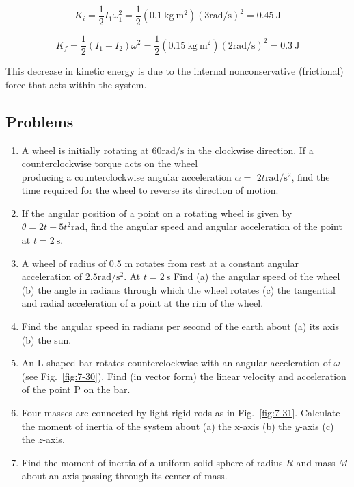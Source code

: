 \documentclass[10pt]{article}
\numberwithin{equation}{section}
\begin{document}
$$
K_{i}=\frac{1}{2} I_{1} \omega_{1}^{2}=\frac{1}{2}\left(0.1 \mathrm{~kg} \mathrm{~m}^{2}\right)(3 \mathrm{rad} / \mathrm{s})^{2}=0.45 \mathrm{~J}
$$

$$
K_{f}=\frac{1}{2}\left(I_{1}+I_{2}\right) \omega^{2}=\frac{1}{2}\left(0.15 \mathrm{~kg} \mathrm{~m}^{2}\right)(2 \mathrm{rad} / \mathrm{s})^{2}=0.3 \mathrm{~J}
$$

This decrease in kinetic energy is due to the internal nonconservative (frictional) force that acts within the system.

\subsection*{Problems}
\begin{enumerate}
  \item A wheel is initially rotating at $60 \mathrm{rad} / \mathrm{s}$ in the clockwise direction. If a counterclockwise torque acts on the wheel\\
producing a counterclockwise angular acceleration $\alpha=$ $2 t \mathrm{rad} / \mathrm{s}^{2}$, find the time required for the wheel to reverse its direction of motion.
  \item If the angular position of a point on a rotating wheel is given by $\theta=2 t+5 t^{2} \mathrm{rad}$, find the angular speed and angular acceleration of the point at $t=2 \mathrm{~s}$.
  \item A wheel of radius of 0.5 m rotates from rest at a constant angular acceleration of $2.5 \mathrm{rad} / \mathrm{s}^{2}$. At $t=2 \mathrm{~s}$ Find (a) the angular speed of the wheel (b) the angle in radians through which the wheel rotates (c) the tangential and radial acceleration of a point at the rim of the wheel.
  \item Find the angular speed in radians per second of the earth about (a) its axis (b) the sun.
  \item An L-shaped bar rotates counterclockwise with an angular acceleration of $\omega$ (see Fig.~\ref{fig:7-30}). Find (in vector form) the linear velocity and acceleration of the point P on the bar.
  \item Four masses are connected by light rigid rods as in Fig.~\ref{fig:7-31}. Calculate the moment of inertia of the system about (a) the x-axis (b) the $y$-axis (c) the $z$-axis.
  \item Find the moment of inertia of a uniform solid sphere of radius $R$ and mass $M$ about an axis passing through its center of mass.
\end{enumerate}
\end{document}
